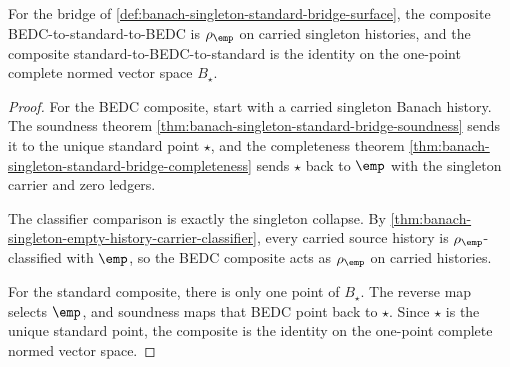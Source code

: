\begin{theorem}
\label{thm:banach-singleton-standard-bridge-roundtrip}
For the bridge of
\autoref{def:banach-singleton-standard-bridge-surface}, the composite
BEDC-to-standard-to-BEDC is $\rho_{\emp}$ on carried singleton histories, and
the composite standard-to-BEDC-to-standard is the identity on the one-point
complete normed vector space $B_{\star}$.
\end{theorem}
\begin{proof}
For the BEDC composite, start with a carried singleton Banach history. The
soundness theorem
\autoref{thm:banach-singleton-standard-bridge-soundness} sends it to the
unique standard point $\star$, and the completeness theorem
\autoref{thm:banach-singleton-standard-bridge-completeness} sends $\star$ back
to $\emp$ with the singleton carrier and zero ledgers.

The classifier comparison is exactly the singleton collapse. By
\autoref{thm:banach-singleton-empty-history-carrier-classifier}, every carried
source history is $\rho_{\emp}$-classified with $\emp$, so the BEDC composite
acts as $\rho_{\emp}$ on carried histories.

For the standard composite, there is only one point of $B_{\star}$. The reverse
map selects $\emp$, and soundness maps that BEDC point back to $\star$. Since
$\star$ is the unique standard point, the composite is the identity on the
one-point complete normed vector space.
\end{proof}

